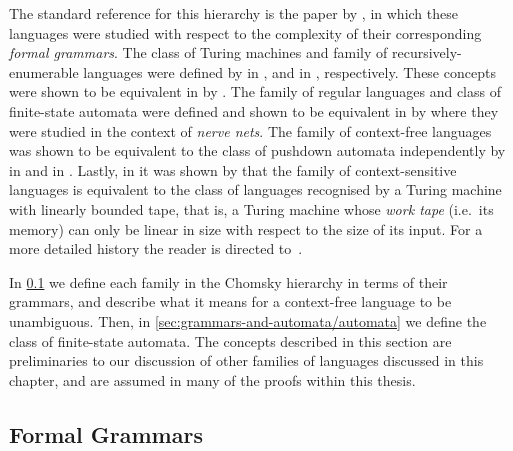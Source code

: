The standard reference for this hierarchy is the \citeyear{chomsky1959} paper by \textcite{chomsky1959}, in which these languages were studied with respect to the complexity of their corresponding \emph{formal grammars}.
The class of Turing machines and family of recursively-enumerable languages were defined by \textcite{turing1936} in \citeyear{turing1936}, and \textcite{post1943} in \citeyear{post1943}, respectively.
These concepts were shown to be equivalent in \citeyear{post1947} by \textcite{post1947}.
The family of regular languages and class of finite-state automata were defined and shown to be equivalent in \citeyear{kleene1956} by \textcite{kleene1956} where they were studied in the context of \textit{nerve nets}.
The family of context-free languages was shown to be equivalent to the class of pushdown automata independently by \textcite{chomsky1962} in \citeyear{chomsky1962} and \textcite{evey1963} in \citeyear{evey1963}.
Lastly, in \citeyear{kuroda1964} it was shown by \textcite{kuroda1964} that the family of context-sensitive languages is equivalent to the class of languages recognised by a Turing machine with linearly bounded tape, that is, a Turing machine whose \textit{work tape} (i.e.~its memory) can only be linear in size with respect to the size of its input.
For a more detailed history the reader is directed to~\cite{greibach1981}.

In \cref{sec:intro-to-formal-lang} we define each family in the Chomsky hierarchy in terms of their grammars, and describe what it means for a context-free language to be unambiguous.
Then, in \cref{sec:grammars-and-automata/automata} we define the class of finite-state automata.
The concepts described in this section are preliminaries to our discussion of other families of languages discussed in this chapter, and are assumed in many of the proofs within this thesis.

\subsection{Formal Grammars}\label{sec:intro-to-formal-lang}

